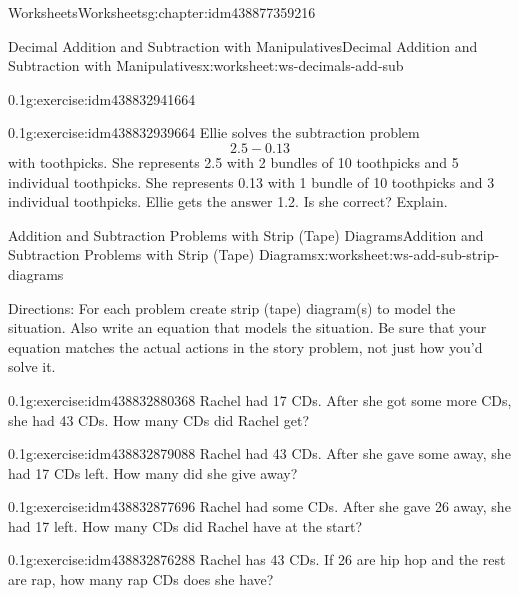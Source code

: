 \documentclass[twoside,11pt,]{book}
\begin{document}
\begin{chapterptx}{Worksheets}{}{Worksheets}{}{}{g:chapter:idm438877359216}
\begin{worksheet-section-numberless}{Decimal Addition and Subtraction with Manipulatives}{}{Decimal Addition and Subtraction with Manipulatives}{}{}{x:worksheet:ws-decimals-add-sub}
\begin{divisionexercise}{3}{}{0.1}{g:exercise:idm438832941664}
\end{divisionexercise}%
\begin{divisionexercise}{4}{}{0.1}{g:exercise:idm438832939664}%
Ellie solves the subtraction problem%
\begin{equation*}
2.5-0.13
\end{equation*}
with toothpicks.  She represents 2.5 with 2 bundles of 10 toothpicks and 5 individual toothpicks.  She represents 0.13 with 1 bundle of 10 toothpicks and 3 individual toothpicks.  Ellie gets the answer 1.2.  Is she correct?  Explain.%
\end{divisionexercise}%
\end{worksheet-section-numberless}
\restoregeometry
%
%
\typeout{************************************************}
\typeout{************************************************}
%
\begin{worksheet-section-numberless}{Addition and Subtraction Problems with Strip (Tape) Diagrams}{}{Addition and Subtraction Problems with Strip (Tape) Diagrams}{}{}{x:worksheet:ws-add-sub-strip-diagrams}
\begin{introduction}{}%
Directions: For each problem create strip (tape) diagram(s) to model the situation.  Also write an equation that models the situation.  Be sure that your equation matches the actual actions in the story problem, not just how you’d solve it.%
\end{introduction}%
\begin{divisionexercise}{1}{}{0.1}{g:exercise:idm438832880368}%
Rachel had 17 CDs.  After she got some more CDs, she had 43 CDs.  How many CDs did Rachel get?%
\end{divisionexercise}%
\begin{divisionexercise}{2}{}{0.1}{g:exercise:idm438832879088}%
Rachel had 43 CDs.  After she gave some away, she had 17 CDs left.  How many did she give away?%
\end{divisionexercise}%
\begin{divisionexercise}{3}{}{0.1}{g:exercise:idm438832877696}%
Rachel had some CDs.  After she gave 26 away, she had 17 left.  How many CDs did Rachel have at the start?%
\end{divisionexercise}%
\begin{divisionexercise}{4}{}{0.1}{g:exercise:idm438832876288}%
Rachel has 43 CDs.  If 26 are hip hop and the rest are rap, how many rap CDs does she have?%

\end{divisionexercise}
\end{worksheet-section-numberless}
\end{chapterptx}
\end{document}
